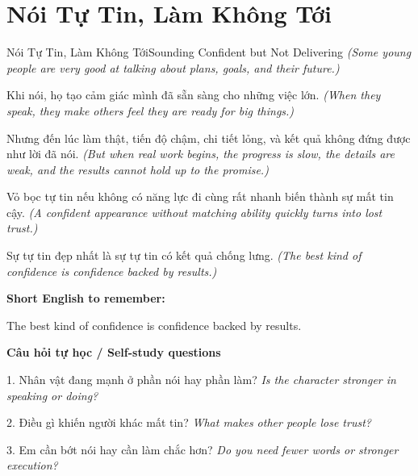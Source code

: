 \section{Nói Tự Tin, Làm Không Tới}
\begin{truyen}{Nói Tự Tin, Làm Không Tới}{Sounding Confident but Not Delivering}
\textit{(Some young people are very good at talking about plans, goals, and their future.)}

Khi nói, họ tạo cảm giác mình đã sẵn sàng cho những việc lớn.
\textit{(When they speak, they make others feel they are ready for big things.)}

Nhưng đến lúc làm thật, tiến độ chậm, chi tiết lỏng, và kết quả không đứng được như lời đã nói.
\textit{(But when real work begins, the progress is slow, the details are weak, and the results cannot hold up to the promise.)}

Vỏ bọc tự tin nếu không có năng lực đi cùng rất nhanh biến thành sự mất tin cậy.
\textit{(A confident appearance without matching ability quickly turns into lost trust.)}

\end{truyen}

\begin{baihoc}
Sự tự tin đẹp nhất là sự tự tin có kết quả chống lưng.
\textit{(The best kind of confidence is confidence backed by results.)}
\end{baihoc}

\begin{ghinhoanh}
\textbf{Short English to remember:}

The best kind of confidence is confidence backed by results.

\end{ghinhoanh}

\begin{tuhocnhanh}
\textbf{Câu hỏi tự học / Self-study questions}

1. Nhân vật đang mạnh ở phần nói hay phần làm? \textit{Is the character stronger in speaking or doing?}

2. Điều gì khiến người khác mất tin? \textit{What makes other people lose trust?}

3. Em cần bớt nói hay cần làm chắc hơn? \textit{Do you need fewer words or stronger execution?}
\end{tuhocnhanh}
\ngancach

